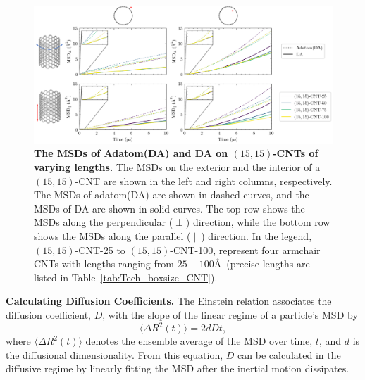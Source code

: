 \documentclass[journal=jpcbfk, layout=twocolumn, manuscript=article]{achemso}
\begin{document}
\begin{figure}[!htbp]
    \centering
    \includegraphics[width=\textwidth]{Appendices/tech_crop.png}
    \caption[The MSDs of Adatom(DA) and DA on $(15,15)$-CNTs of varying lengths.]{\textbf{The MSDs of Adatom(DA) and DA on $(15,15)$-CNTs of varying lengths.} The MSDs on the exterior and the interior of a $(15,15)$-CNT are shown in the left and right columns, respectively. The MSDs of adatom(DA) are shown in dashed curves, and the MSDs of DA are shown in solid curves. The top row shows the MSDs along the perpendicular ($\perp$) direction, while the bottom row shows the MSDs along the parallel ($\parallel$) direction. In the legend, $(15,15)$-CNT-25 to $(15,15)$-CNT-100, represent four armchair CNTs with lengths ranging from $25-100$\AA\ (precise lengths are listed in Table~\ref{tab:Tech_boxsize_CNT}).
    }
    \label{fig:Tech_boxsize_CNT_MSD}
\end{figure}

{\bf{Calculating Diffusion Coefficients.}}
The Einstein relation associates the diffusion coefficient, $D$, with the slope of the linear regime of a particle's MSD by 
\begin{equation}
\langle\Delta R^2(t)\rangle=2dDt,
\label{eqn:methods_analysis_coefficient_MSD}
\end{equation}
where $\langle\Delta R^2(t)\rangle$ denotes the ensemble average of the MSD over time, $t$, and $d$ is the diffusional dimensionality. From this equation, $D$ can be calculated in the diffusive regime by linearly fitting the MSD after the inertial motion dissipates. 
\end{document}
